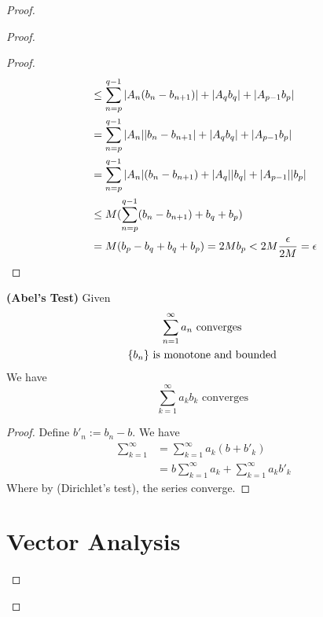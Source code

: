 \documentclass{report}
\begin{document}
\begin{proof}
\begin{proof}
\begin{proof}
\begin{align}
&\leq \sum_{n=p}^{q-1}|A_n(b_n-b_{n+1})|+|A_qb_q|+|A_{p-1}b_p|\\
&=\sum_{n=p}^{q-1} |A_n||b_n-b_{n+1}|+|A_qb_q|+|A_{p-1}b_p|\\
&=\sum_{n=p}^{q-1}|A_n|(b_n-b_{n+1})+|A_q||b_q|+|A_{p-1}||b_p|\\
&\leq M(\sum_{n=p}^{q-1}(b_n-b_{n+1})+b_q+b_p)\\
&=M(b_p-b_q+b_q+b_p)=2Mb_p<2M \frac{\epsilon }{2M}=\epsilon 
\end{align}
\end{proof}
\begin{theorem}
\label{4.5.6}
\textbf{(Abel's Test)}
Given 
\begin{gather}
\sum_{n=1}^\infty a_n\text{ converges }\\
\{ b_n \}\text{ is monotone and bounded }
\end{gather}
We have
\begin{equation}
\sum_{k=1}^\infty a_kb_k\text{ converges }
\end{equation}
\end{theorem}
\begin{proof}
Define $b'_n:=b_n-b$. We have
 \begin{align}
\sum_{k=1}^\infty &=\sum_{k=1}^\infty a_k(b+b'_k)\\
&=b\sum_{k=1}^\infty a_k+\sum_{k=1}^\infty a_kb'_k
\end{align}
Where by   (Dirichlet's test), the series converge.
\end{proof}

\chapter{Vector Analysis}

\end{proof}
\end{proof}
\end{document}
